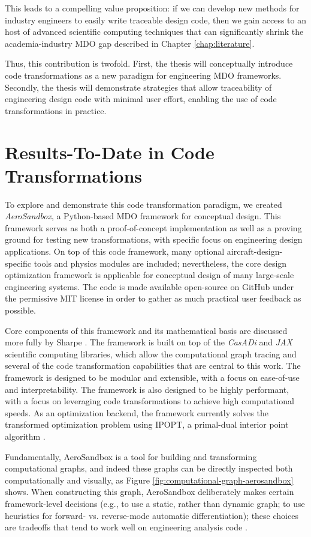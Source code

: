 This leads to a compelling value proposition: if we can develop new methods for industry engineers to easily write traceable design code, then we gain access to an host of advanced scientific computing techniques that can significantly shrink the academia-industry MDO gap described in Chapter \ref{chap:literature}.

Thus, this contribution is twofold. First, the thesis will conceptually introduce code transformations as a new paradigm for engineering MDO frameworks. Secondly, the thesis will demonstrate strategies that allow traceability of engineering design code with minimal user effort, enabling the use of code transformations in practice.

\section{Results-To-Date in Code Transformations}


To explore and demonstrate this code transformation paradigm, we created \textit{AeroSandbox}, a Python-based MDO framework for conceptual design. This framework serves as both a proof-of-concept implementation as well as a proving ground for testing new transformations, with specific focus on engineering design applications. On top of this code framework, many optional aircraft-design-specific tools and physics modules are included; nevertheless, the core design optimization framework is applicable for conceptual design of many large-scale engineering systems. The code is made available open-source on GitHub under the permissive MIT license in order to gather as much practical user feedback as possible.

Core components of this framework and its mathematical basis are discussed more fully by Sharpe \cite{sharpe_aerosandbox_2021}. The framework is built on top of the \textit{CasADi} \cite{casadi} and \textit{JAX} \cite{jax} scientific computing libraries, which allow the computational graph tracing and several of the code transformation capabilities that are central to this work. The framework is designed to be modular and extensible, with a focus on ease-of-use and interpretability. The framework is also designed to be highly performant, with a focus on leveraging code transformations to achieve high computational speeds. As an optimization backend, the framework currently solves the transformed optimization problem using IPOPT, a primal-dual interior point algorithm \cite{wachter_implementation_2006}.

Fundamentally, AeroSandbox is a tool for building and transforming computational graphs, and indeed these graphs can be directly inspected both computationally and visually, as Figure \ref{fig:computational-graph-aerosandbox} shows. When constructing this graph, AeroSandbox deliberately makes certain framework-level decisions (e.g., to use a static, rather than dynamic graph; to use heuristics for forward- vs. reverse-mode automatic differentiation); these choices are tradeoffs that tend to work well on engineering analysis code \cite{rackauckas_engineering_2021}.

